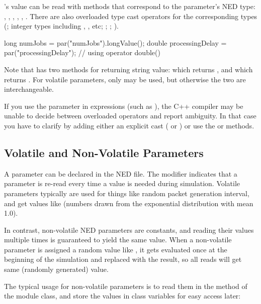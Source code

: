 's value can be read with methods that correspond to
the parameter's NED type: , ,
, , ,
.
There are also overloaded type cast operators for the corresponding types
(; integer types including , , etc;
; ; ).

\begin{cpp}
long numJobs = par("numJobs").longValue();
double processingDelay = par("processingDelay"); // using operator double()
\end{cpp}

Note that  has two methods for returning string value:
 which returns , and
 which returns .
For volatile parameters, only  may be used,
but otherwise the two are interchangeable.

If you use the  parameter in expressions (such as
), the C++ compiler may be unable to decide
between overloaded operators and report ambiguity. In that case
you have to clarify by adding either an explicit cast
( or ) or use
the  or  methods.


\subsection{Volatile and Non-Volatile Parameters}
\label{sec:simple-modules:volatile-parameters}

A parameter can be declared  in the NED file. The 
modifier indicates that a parameter is re-read every time a value is needed
during simulation. Volatile parameters typically are used for things like
random packet generation interval, and get values like 
(numbers drawn from the exponential distribution with mean 1.0).

In contrast, non-volatile NED parameters are constants, and reading their
values multiple times is guaranteed to yield the same value. When a non-volatile
parameter is assigned a random value like , it gets
evaluated once at the beginning of the simulation and replaced with the result,
so all reads will get same (randomly generated) value.

The typical usage for non-volatile parameters is to read them in the
 method of the module class, and store the values
in class variables for easy access later:

